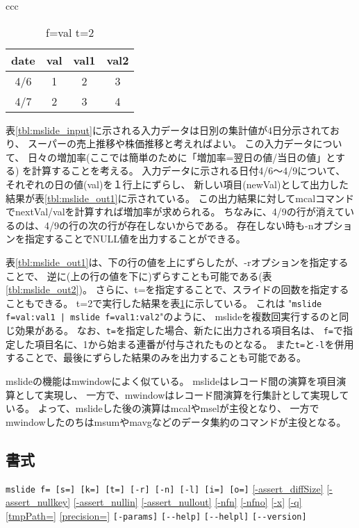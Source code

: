 \begin{table}[htbp]
\begin{center}
\begin{tabular}{ccc}
\begin{minipage}{0.28\hsize}
\begin{center}
\caption{f=val t=2\label{tbl:mslide_out3}}
{\small
\begin{tabular}{cccc}
\hline
date&val&val1&val2 \\
\hline
4/6&1&2&3 \\
4/7&2&3&4 \\
\hline
\end{tabular}
}
\end{center}
\end{minipage}

\end{tabular}
\end{center}
\end{table}

表\ref{tbl:mslide_input}に示される入力データは日別の集計値が4日分示されており、
スーパーの売上推移や株価推移と考えればよい。
この入力データについて、
日々の増加率(ここでは簡単のために「増加率=翌日の値/当日の値」とする)
を計算することを考える。
入力データに示される日付4/6〜4/9について、
それぞれの日の値(val)を１行上にずらし、
新しい項目(newVal)として出力した結果が表\ref{tbl:mslide_out1}に示されている。
この出力結果に対してmcalコマンドでnextVal/valを計算すれば増加率が求められる。
ちなみに、4/9の行が消えているのは、4/9の行の次の行が存在しないからである。
存在しない時も-nオプションを指定することでNULL値を出力することができる。

表\ref{tbl:mslide_out1}は、下の行の値を上にずらしたが、-rオプションを指定することで、
逆に(上の行の値を下に)ずらすことも可能である(表\ref{tbl:mslide_out2})。
さらに、t=を指定することで、スライドの回数を指定することもできる。
t=2で実行した結果を表\ref{tbl:mslide_out3}に示している。
これは "\verb/mslide f=val:val1 | mslide f=val1:val2/"のように、
mslideを複数回実行するのと同じ効果がある。
なお、\verb|t=|を指定した場合、新たに出力される項目名は、
\verb|f=|で指定した項目名に、1から始まる連番が付与されたものとなる。
また\verb|t=|と\verb|-l|を併用することで、最後にずらした結果のみを出力することも可能である。

mslideの機能はmwindowによく似ている。
mslideはレコード間の演算を項目演算として実現し、
一方で、mwindowはレコード間演算を行集計として実現している。
よって、mslideした後の演算はmcalやmselが主役となり、
一方でmwindowしたのちはmsumやmavgなどのデータ集約のコマンドが主役となる。

\subsection*{書式}
\verb|mslide f= [s=] [k=] [t=] [-r] [-n] [-l] [i=] [o=]|
\hyperref[sect:option_assert_diffSize]{[-assert\_diffSize]}
\hyperref[sect:option_assert_nullkey]{[-assert\_nullkey]}
\hyperref[sect:option_assert_nullin]{[-assert\_nullin]}
\hyperref[sect:option_assert_nullout]{[-assert\_nullout]}
\hyperref[sect:option_nfn]{[-nfn]} 
\hyperref[sect:option_nfno]{[-nfno]}  
\hyperref[sect:option_x]{[-x]}
\hyperref[sect:option_q]{[-q]}
\hyperref[sect:option_option_tmppath]{[tmpPath=]}
\hyperref[sect:option_precision]{[precision=]}
\verb|[-params]|
\verb|[--help]|
\verb|[--helpl]|
\verb|[--version]|\\

